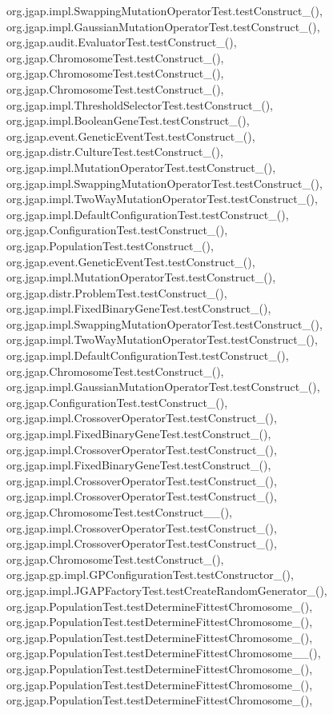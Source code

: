 org.\-jgap.\-impl.\-Swapping\-Mutation\-Operator\-Test.\-test\-Construct\-\_(), org.\-jgap.\-impl.\-Gaussian\-Mutation\-Operator\-Test.\-test\-Construct\-\_(), org.\-jgap.\-audit.\-Evaluator\-Test.\-test\-Construct\-\_(), org.\-jgap.\-Chromosome\-Test.\-test\-Construct\-\_(), org.\-jgap.\-Chromosome\-Test.\-test\-Construct\-\_(), org.\-jgap.\-Chromosome\-Test.\-test\-Construct\-\_(), org.\-jgap.\-impl.\-Threshold\-Selector\-Test.\-test\-Construct\-\_(), org.\-jgap.\-impl.\-Boolean\-Gene\-Test.\-test\-Construct\-\_(), org.\-jgap.\-event.\-Genetic\-Event\-Test.\-test\-Construct\-\_(), org.\-jgap.\-distr.\-Culture\-Test.\-test\-Construct\-\_(), org.\-jgap.\-impl.\-Mutation\-Operator\-Test.\-test\-Construct\-\_(), org.\-jgap.\-impl.\-Swapping\-Mutation\-Operator\-Test.\-test\-Construct\-\_(), org.\-jgap.\-impl.\-Two\-Way\-Mutation\-Operator\-Test.\-test\-Construct\-\_(), org.\-jgap.\-impl.\-Default\-Configuration\-Test.\-test\-Construct\-\_(), org.\-jgap.\-Configuration\-Test.\-test\-Construct\-\_(), org.\-jgap.\-Population\-Test.\-test\-Construct\-\_(), org.\-jgap.\-event.\-Genetic\-Event\-Test.\-test\-Construct\-\_(), org.\-jgap.\-impl.\-Mutation\-Operator\-Test.\-test\-Construct\-\_(), org.\-jgap.\-distr.\-Problem\-Test.\-test\-Construct\-\_(), org.\-jgap.\-impl.\-Fixed\-Binary\-Gene\-Test.\-test\-Construct\-\_(), org.\-jgap.\-impl.\-Swapping\-Mutation\-Operator\-Test.\-test\-Construct\-\_(), org.\-jgap.\-impl.\-Two\-Way\-Mutation\-Operator\-Test.\-test\-Construct\-\_(), org.\-jgap.\-impl.\-Default\-Configuration\-Test.\-test\-Construct\-\_(), org.\-jgap.\-Chromosome\-Test.\-test\-Construct\-\_(), org.\-jgap.\-impl.\-Gaussian\-Mutation\-Operator\-Test.\-test\-Construct\-\_(), org.\-jgap.\-Configuration\-Test.\-test\-Construct\-\_(), org.\-jgap.\-impl.\-Crossover\-Operator\-Test.\-test\-Construct\-\_(), org.\-jgap.\-impl.\-Fixed\-Binary\-Gene\-Test.\-test\-Construct\-\_(), org.\-jgap.\-impl.\-Crossover\-Operator\-Test.\-test\-Construct\-\_(), org.\-jgap.\-impl.\-Fixed\-Binary\-Gene\-Test.\-test\-Construct\-\_(), org.\-jgap.\-impl.\-Crossover\-Operator\-Test.\-test\-Construct\-\_(), org.\-jgap.\-impl.\-Crossover\-Operator\-Test.\-test\-Construct\-\_(), org.\-jgap.\-Chromosome\-Test.\-test\-Construct\-\_\-\_(), org.\-jgap.\-impl.\-Crossover\-Operator\-Test.\-test\-Construct\-\_(), org.\-jgap.\-impl.\-Crossover\-Operator\-Test.\-test\-Construct\-\_(), org.\-jgap.\-Chromosome\-Test.\-test\-Construct\-\_(), org.\-jgap.\-gp.\-impl.\-G\-P\-Configuration\-Test.\-test\-Constructor\-\_(), org.\-jgap.\-impl.\-J\-G\-A\-P\-Factory\-Test.\-test\-Create\-Random\-Generator\-\_(), org.\-jgap.\-Population\-Test.\-test\-Determine\-Fittest\-Chromosome\-\_(), org.\-jgap.\-Population\-Test.\-test\-Determine\-Fittest\-Chromosome\-\_(), org.\-jgap.\-Population\-Test.\-test\-Determine\-Fittest\-Chromosome\-\_(), org.\-jgap.\-Population\-Test.\-test\-Determine\-Fittest\-Chromosome\-\_\-\_(), org.\-jgap.\-Population\-Test.\-test\-Determine\-Fittest\-Chromosome\-\_(), org.\-jgap.\-Population\-Test.\-test\-Determine\-Fittest\-Chromosome\-\_(), org.\-jgap.\-Population\-Test.\-test\-Determine\-Fittest\-Chromosome\-\_(), 